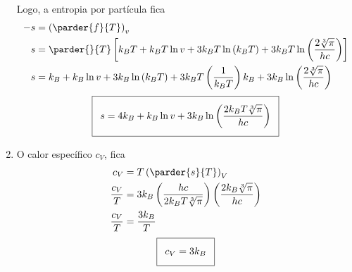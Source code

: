 \begin{prob}
\begin{sol}
\begin{enumerate}[label=\alph *)]
      Logo, a entropia por partícula fica
      \begin{align}
        \begin{split}
          -s&=\left(\parder{f}{T}\right)_v\\
          s&=\parder{}{T}\left[k_BT+k_BT\ln v+3k_BT\ln\left(k_BT\right)+3k_BT\ln\left(\frac{2\sqrt[3]{\pi}}{hc}\right)\right]\\
          s&=k_B+k_B\ln v+3k_B\ln\left(k_BT\right)+3k_BT\left(\frac{1}{k_BT}\right)k_B+3k_B\ln\left(\frac{2\sqrt[3]{\pi}}{hc}\right)
        \end{split}
      \end{align}
      \begin{align}
        \addtolength{\fboxsep}{5pt}
        \boxed{
          \begin{gathered}
            s=4k_B+k_B\ln v+3k_B\ln\left(\frac{2k_BT\sqrt[3]{\pi}}{hc}\right)
          \end{gathered}
        }
      \end{align}
      \item O calor específico $c_V$, fica
      \begin{align}
        \begin{split}
          c_V&=T\left(\parder{s}{T}\right)_V\\
          \frac{c_V}{T}&=3k_B\left(\frac{hc}{2k_BT\sqrt[3]{\pi}}\right)\left(\frac{2k_B\sqrt[3]{\pi}}{hc}\right)\\
          \frac{c_V}{T}&=\frac{3k_B}{T}
        \end{split}
      \end{align}
      \begin{align}
        \addtolength{\fboxsep}{5pt}
        \boxed{
          \begin{gathered}
            c_V=3k_B
          \end{gathered}
        }
      \end{align}
    \end{enumerate}
  \end{sol}
\end{prob}
